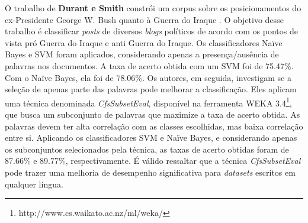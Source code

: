 O trabalho de \textbf{Durant e Smith} constrói um corpus sobre os posicionamentos do ex-Presidente George W. Bush quanto à Guerra do Iraque \cite{durant-smith}. O objetivo desse trabalho é classificar \emph{posts} de diversos \emph{blogs} políticos de acordo com os pontos de vista pró Guerra do Iraque e anti Guerra do Iraque.  Os classificadores Naïve Bayes e SVM foram aplicados, considerando apenas a presença/ausência de palavras nos documentos. A taxa de acerto obtida com um SVM foi de 75.47\%. Com o Naïve Bayes, ela foi de 78.06\%. Os autores, em seguida, investigam se a seleção de apenas parte das palavras pode melhorar a classificação. Eles aplicam uma técnica denominada \emph{CfsSubsetEval}, disponível na ferramenta WEKA 3.4\footnote{http://www.cs.waikato.ac.nz/ml/weka/}, que busca um subconjunto de palavras que maximize a taxa de acerto obtida. As palavras devem ter alta correlação com as classes escolhidas, mas baixa correlação entre si. Aplicando os classificadores SVM e Naïve Bayes, e considerando apenas os subconjuntos selecionados pela técnica, as taxas de acerto obtidas foram de 87.66\% e 89.77\%, respectivamente. É válido ressaltar que a técnica \emph{CfsSubsetEval} pode trazer uma melhoria de desempenho significativa para \emph{datasets} escritos em qualquer língua.

